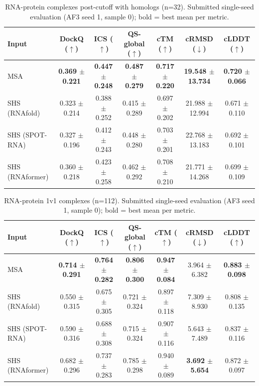 \begin{table}[htbp]
\centering
\caption{RNA-protein complexes post-cutoff with homologs (n=32). Submitted single-seed evaluation (AF3 seed 1, sample 0); bold = best mean per metric.}
\label{tab:rna_protein_complexes_post_cutoff_with_homologs}
\begin{tabular}{lcccccc}
\toprule
Input & DockQ ($\uparrow$) & ICS ($\uparrow$) & QS-global ($\uparrow$) & cTM ($\uparrow$) & cRMSD ($\downarrow$) & cLDDT ($\uparrow$) \\
\midrule
MSA & \textbf{0.369 $\pm$ 0.221} & \textbf{0.447 $\pm$ 0.248} & \textbf{0.487 $\pm$ 0.279} & \textbf{0.717 $\pm$ 0.220} & \textbf{19.548 $\pm$ 13.734} & \textbf{0.720 $\pm$ 0.066} \\
SHS (RNAfold) & 0.323 $\pm$ 0.214 & 0.388 $\pm$ 0.252 & 0.415 $\pm$ 0.289 & 0.697 $\pm$ 0.202 & 21.988 $\pm$ 12.994 & 0.671 $\pm$ 0.110 \\
SHS (SPOT-RNA) & 0.327 $\pm$ 0.196 & 0.412 $\pm$ 0.243 & 0.448 $\pm$ 0.280 & 0.703 $\pm$ 0.201 & 22.768 $\pm$ 13.183 & 0.692 $\pm$ 0.101 \\
SHS (RNAformer) & 0.360 $\pm$ 0.218 & 0.423 $\pm$ 0.258 & 0.462 $\pm$ 0.292 & 0.708 $\pm$ 0.210 & 21.771 $\pm$ 14.268 & 0.699 $\pm$ 0.109 \\
\bottomrule
\end{tabular}
\end{table}

\begin{table}[htbp]
\centering
\caption{RNA-protein 1v1 complexes (n=112). Submitted single-seed evaluation (AF3 seed 1, sample 0); bold = best mean per metric.}
\label{tab:rna_protein_1v1_complexes}
\begin{tabular}{lcccccc}
\toprule
Input & DockQ ($\uparrow$) & ICS ($\uparrow$) & QS-global ($\uparrow$) & cTM ($\uparrow$) & cRMSD ($\downarrow$) & cLDDT ($\uparrow$) \\
\midrule
MSA & \textbf{0.714 $\pm$ 0.291} & \textbf{0.764 $\pm$ 0.282} & \textbf{0.806 $\pm$ 0.300} & \textbf{0.947 $\pm$ 0.084} & 3.964 $\pm$ 6.382 & \textbf{0.883 $\pm$ 0.098} \\
SHS (RNAfold) & 0.550 $\pm$ 0.315 & 0.675 $\pm$ 0.305 & 0.721 $\pm$ 0.324 & 0.897 $\pm$ 0.118 & 7.309 $\pm$ 8.930 & 0.808 $\pm$ 0.135 \\
SHS (SPOT-RNA) & 0.590 $\pm$ 0.316 & 0.688 $\pm$ 0.308 & 0.715 $\pm$ 0.324 & 0.907 $\pm$ 0.116 & 5.643 $\pm$ 7.489 & 0.837 $\pm$ 0.116 \\
SHS (RNAformer) & 0.682 $\pm$ 0.296 & 0.737 $\pm$ 0.283 & 0.785 $\pm$ 0.298 & 0.940 $\pm$ 0.089 & \textbf{3.692 $\pm$ 5.654} & 0.872 $\pm$ 0.097 \\
\bottomrule
\end{tabular}
\end{table}

